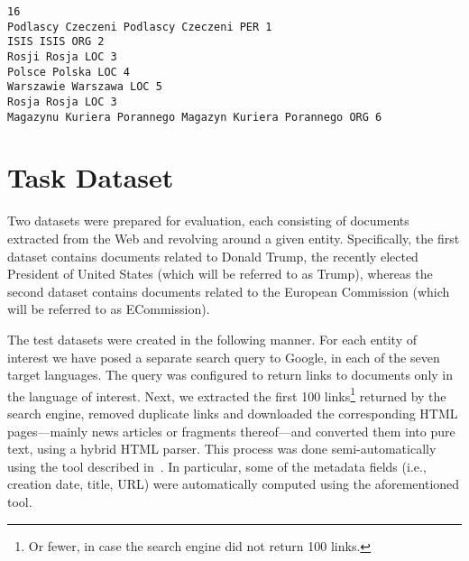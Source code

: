 \documentclass[11pt]{article}
\begin{document}
\begin{small}
\begin{verbatim}
16
Podlascy Czeczeni Podlascy Czeczeni PER 1
ISIS ISIS ORG 2
Rosji Rosja LOC 3
Polsce Polska LOC 4
Warszawie Warszawa LOC 5
Rosja Rosja LOC 3
Magazynu Kuriera Porannego Magazyn Kuriera Porannego ORG 6
\end{verbatim}	    
\end{small}

\section{Task Dataset}
\label{sec:annotation}

Two datasets were prepared for evaluation, each consisting of documents
extracted from the Web and revolving around a given entity.
Specifically, the first dataset contains documents related to Donald
Trump, the recently elected President of United States (which will be
referred to as {\sc Trump}), whereas the second dataset contains
documents related to the European Commission (which will be referred to
as {\sc ECommission}).


The test datasets were created in the following manner.  For each entity
of interest we have posed a separate search query to Google, in each of
the seven target languages.  The query was configured to return links to
documents only in the language of interest.  Next, we extracted the first
100 links\footnote{Or fewer, in case the search engine did not return 100
  links.} returned by the search engine, removed duplicate links and
downloaded the corresponding HTML pages---mainly news articles or
fragments thereof---and converted them into pure text, using a hybrid
HTML parser.  This process was done semi-automatically using the tool
described in~\cite{Crawley:ea:2010}.  In particular, some of the metadata
fields (i.e., creation date, title, URL) were automatically computed
using the aforementioned tool.

\end{document}
